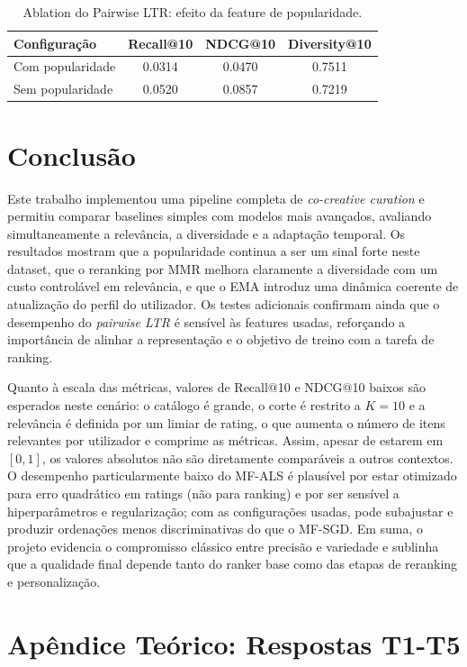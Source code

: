 \documentclass[10pt]{article}
\begin{document}
\begin{table}[H]
\centering
\small
\renewcommand{\arraystretch}{1.2}
\begin{tabular}{lccc}
\toprule
\textbf{Configuração} & \textbf{Recall@10} & \textbf{NDCG@10} & \textbf{Diversity@10} \\
\midrule
Com popularidade & 0.0314 & 0.0470 & 0.7511 \\
Sem popularidade & 0.0520 & 0.0857 & 0.7219 \\
\bottomrule
\end{tabular}
\caption{Ablation do Pairwise LTR: efeito da feature de popularidade.}
\label{tab:ablation_popularity}
\end{table}










\section{Conclusão}
Este trabalho implementou uma pipeline completa de \textit{co-creative curation} e permitiu comparar baselines simples com modelos mais avançados, avaliando simultaneamente a relevância, a diversidade e a adaptação temporal. Os resultados mostram que a popularidade continua a ser um sinal forte neste dataset, que o reranking por MMR melhora claramente a diversidade com um custo controlável em relevância, e que o EMA introduz uma dinâmica coerente de atualização do perfil do utilizador. Os testes adicionais confirmam ainda que o desempenho do \textit{pairwise LTR} é sensível às features usadas, reforçando a importância de alinhar a representação e o objetivo de treino com a tarefa de ranking.

Quanto à escala das métricas, valores de Recall@10 e NDCG@10 baixos são esperados neste cenário: o catálogo é grande, o corte é restrito a $K=10$ e a relevância é definida por um limiar de rating, o que aumenta o número de itens relevantes por utilizador e comprime as métricas. Assim, apesar de estarem em $[0,1]$, os valores absolutos não são diretamente comparáveis a outros contextos. O desempenho particularmente baixo do MF-ALS é plausível por estar otimizado para erro quadrático em ratings (não para ranking) e por ser sensível a hiperparâmetros e regularização; com as configurações usadas, pode subajustar e produzir ordenações menos discriminativas do que o MF-SGD. Em suma, o projeto evidencia o compromisso clássico entre precisão e variedade e sublinha que a qualidade final depende tanto do ranker base como das etapas de reranking e personalização.


\newpage

\appendix
\section{Apêndice Teórico: Respostas T1-T5}



\end{document}
